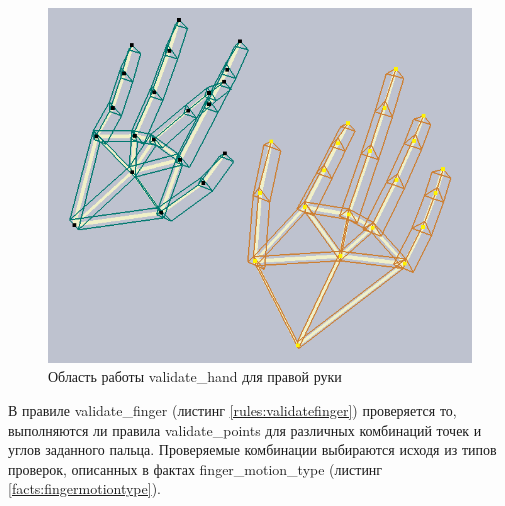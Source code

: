 \begin{figure}[ht!]
	\centering
	\includegraphics[scale=0.5]{img/example-validate-hand.png}
	\caption{Область работы validate\_hand для правой руки}
	\label{fig:valhand}
\end{figure}

\hspace{0.6cm} В правиле validate\_finger (листинг \ref{rules:validatefinger}) проверяется то, выполняются ли правила validate\_points для различных комбинаций точек и углов заданного пальца. Проверяемые комбинации выбираются исходя из типов проверок, описанных в фактах finger\_motion\_type (листинг \ref{facts:fingermotiontype}).


